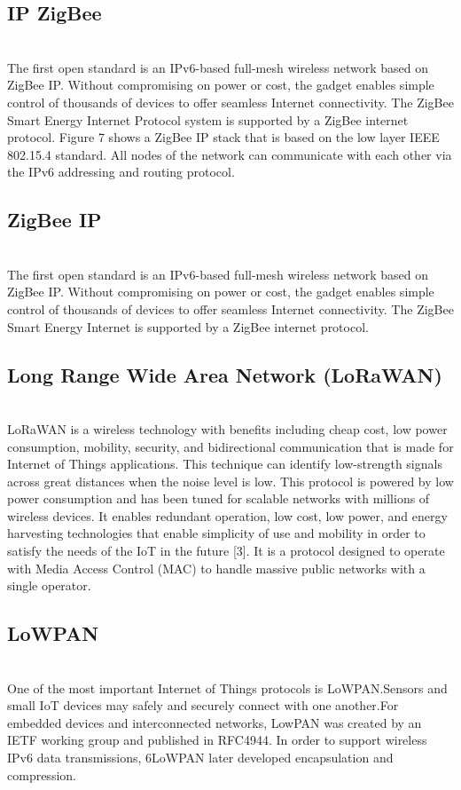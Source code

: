 \documentclass{article}
\begin{document}
\subsection{IP ZigBee}
\\
The first open standard is an IPv6-based full-mesh wireless network based on ZigBee IP. Without compromising on power or cost, the gadget enables simple control of thousands of devices to offer seamless Internet connectivity. The ZigBee Smart Energy Internet Protocol system is supported by a ZigBee internet protocol. Figure 7 shows a ZigBee IP stack that is based on the low layer IEEE 802.15.4 standard. All nodes of the network can communicate with each other via the IPv6 addressing and routing protocol.
\\
\subsection{ ZigBee IP}
\\
The first open standard is an IPv6-based full-mesh wireless network based on ZigBee IP. Without compromising on power or cost, the gadget enables simple control of thousands of devices to offer seamless Internet connectivity. The ZigBee Smart Energy Internet is supported by a ZigBee internet protocol.
\\
\subsection{Long Range Wide Area Network (LoRaWAN)}
\\
LoRaWAN is a wireless technology with benefits including cheap cost, low power consumption, mobility, security, and bidirectional communication that is made for Internet of Things applications. This technique can identify low-strength signals across great distances when the noise level is low. This protocol is powered by low power consumption and has been tuned for scalable networks with millions of wireless devices. It enables redundant operation, low cost, low power, and energy harvesting technologies that enable simplicity of use and mobility in order to satisfy the needs of the IoT in the future [3]. It is a protocol designed to operate with Media Access Control (MAC) to handle massive public networks with a single operator.
\\
\subsection{LoWPAN}
\\
 One of the most important Internet of Things protocols is LoWPAN.Sensors and small IoT devices may safely and securely connect with one another.For embedded devices and interconnected networks, LowPAN was created by an IETF working group and published in RFC4944. In order to support wireless IPv6 data transmissions, 6LoWPAN later developed encapsulation and compression.
\end{document}
